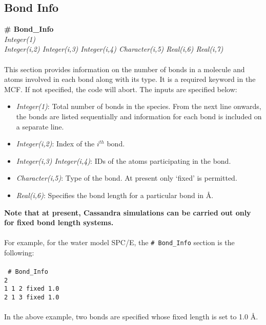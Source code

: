 \subsection{Bond Info}\label{sec:Get_Bond_Info}
%
{\bf \# Bond\_Info} \\
{\it Integer(1)} \\
{\it Integer(i,2) Integer(i,3) Integer(i,4) Character(i,5) Real(i,6) Real(i,7)} \\
\\
This section provides information on the number of bonds in a molecule
and atoms involved in each bond along with its type.  It is a required keyword in the MCF. 
If not specified, the code will abort. The inputs are specified below: \\ 
%
\begin{itemize}

\item {\it Integer(1)}: Total number of bonds in the species. From the
next line onwards, the bonds are listed sequentially and information
for each bond is included on a separate line.
%
\item {\it Integer(i,2)}:  Index of the $i^{th}$ bond.
%
\item {\it Integer(i,3) Integer(i,4)}: IDs of the atoms participating in
the bond.
%
\item {\it Character(i,5)}: Type of the bond. At present only
`fixed' is  permitted. 
\item {\it Real(i,6)}: Specifies the bond length for a particular bond in \AA.

\end{itemize}
%
{\bf Note that at present, Cassandra simulations can be carried out
  only for fixed bond length systems.} \\ \\
%
For example, for the water model SPC/E, the \texttt{\# Bond\_Info} section is the following: \\ \\
%
\texttt{
\# Bond\_Info \\
2 \\
1    1    2    fixed     1.0 \\
2    1    3    fixed     1.0 \\
} \\
%
In the above example, two bonds are specified whose fixed length is set to 1.0 \AA.

